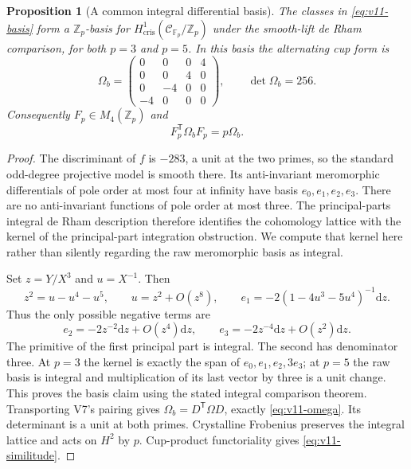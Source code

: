 \documentclass[11pt]{article}
\newtheorem{proposition}[proposition]{Proposition}
\theoremstyle{definition}
\theoremstyle{remark}
\newcommand{\F}{\mathbb F}
\newcommand{\Z}{\mathbb Z}
\newcommand{\dd}{\mathrm d}
\begin{document}
\begin{proposition}[A common integral differential basis]
\label{prop:v11-integral}
The classes in \cref{eq:v11-basis} form a $\Z_p$-basis for
$H^1_{\mathrm{cris}}(\mathcal C_{\F_p}/\Z_p)$ under the smooth-lift
de Rham comparison, for both $p=3$ and $p=5$. In this basis the
alternating cup form is
\begin{equation}
 \boxed{\Omega_b=
 \begin{pmatrix}
 0&0&0&4\\0&0&4&0\\0&-4&0&0\\-4&0&0&0
 \end{pmatrix},\qquad \det\Omega_b=256.}
 \label{eq:v11-omega}
\end{equation}
Consequently $F_p\in M_4(\Z_p)$ and
\begin{equation}
 \boxed{F_p^{\mathsf T}\Omega_bF_p=p\Omega_b.}
 \label{eq:v11-similitude}
\end{equation}
\end{proposition}
\begin{proof}
The discriminant of $f$ is $-283$, a unit at the two primes, so the
standard odd-degree projective model is smooth there. Its anti-invariant
meromorphic differentials of pole order at most four at infinity have
basis $e_0,e_1,e_2,e_3$. There are no anti-invariant functions of pole
order at most three. The principal-parts integral de Rham description
\cite[Sections 3--5]{BogaartBasis} therefore identifies the cohomology
lattice with the kernel of the principal-part integration obstruction.
We compute that kernel here rather than silently regarding the raw
meromorphic basis as integral.

Set $z=Y/X^3$ and $u=X^{-1}$. Then
\[
 z^2=u-u^4-u^5,\qquad u=z^2+O(z^8),\qquad
 e_1=-2(1-4u^3-5u^4)^{-1}\dd z.
\]
Thus the only possible negative terms are
\[
 e_2=-2z^{-2}\dd z+O(z^4)\dd z,\qquad
 e_3=-2z^{-4}\dd z+O(z^2)\dd z.
\]
The primitive of the first principal part is integral. The second
has denominator three. At $p=3$ the kernel is exactly the span of
$e_0,e_1,e_2,3e_3$; at $p=5$ the raw basis is integral and multiplication
of its last vector by three is a unit change. This proves the basis
claim using the stated integral comparison theorem. Transporting V7's
pairing gives $\Omega_b=D^{\mathsf T}\Omega D$, exactly
\cref{eq:v11-omega}. Its determinant is a unit at both primes.
Crystalline Frobenius preserves the integral lattice and acts on $H^2$
by $p$. Cup-product functoriality gives \cref{eq:v11-similitude}.
\end{proof}
\end{document}
